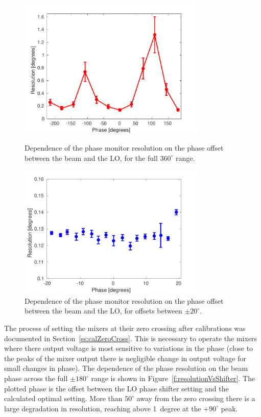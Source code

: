 \begin{figure}
  \centering
  \includegraphics[width=0.8\textwidth]{Figures/phaseMons/resolutionVsShifter}
  \caption{Dependence of the phase monitor resolution on the phase offset between the beam and the LO, for the full \(360^\circ\) range.}
  \label{f:resolutionVsShifter}
  \includegraphics[width=0.8\textwidth]{Figures/phaseMons/resVsSmallPhasOff}
  \caption{Dependence of the phase monitor resolution on the phase offset between the beam and the LO, for offsets between \(\pm20^\circ\).}
  \label{f:resVsSmallPhasOff}
\end{figure}

The process of setting the mixers at their zero crossing after calibrations was documented in Section~\ref{ss:calZeroCross}. This is necessary to operate the mixers where there output voltage is most sensitive to variations in the phase (close to the peaks of the mixer output there is negligible change in output voltage for small changes in phase). The dependence of the phase resolution on the beam phase across the full \(\pm180^\circ\) range is shown in Figure~\ref{f:resolutionVsShifter}. The plotted phase is the offset between the LO phase shifter setting and the calculated optimal setting. More than \(50^\circ\) away from the zero crossing there is a large degradation in resolution, reaching above 1~degree at the \(+90^\circ\) peak.

